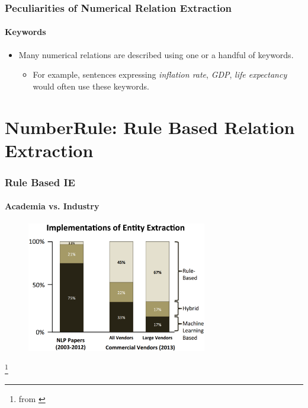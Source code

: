 \documentclass{beamer}
\begin{document}
\begin{frame}
\frametitle{Peculiarities of Numerical Relation Extraction}
\framesubtitle{Keywords}

\begin{itemize}
\item Many numerical relations are described using one or a handful of keywords.
\begin{itemize}
\item For example, sentences expressing \emph{inflation rate}, \emph{GDP}, \emph{life expectancy} would often use these keywords.
\end{itemize}
\end{itemize}

\end{frame}


\section{NumberRule: Rule Based Relation Extraction}

\begin{frame}
\frametitle{Rule Based IE}
\framesubtitle{Academia vs. Industry}

\begin{figure}
\includegraphics[width=0.7\textwidth]{images/longliverulebased.eps}
\end{figure}

\footnote{from \cite{chiticariu2013rule}}

\end{frame}
\end{document}
